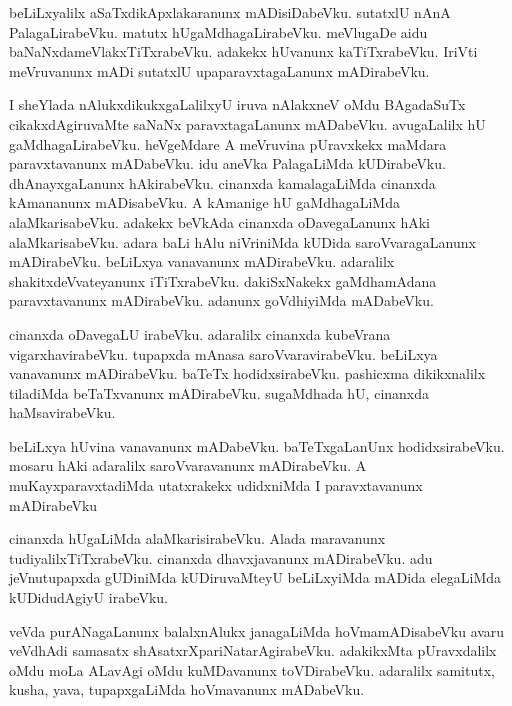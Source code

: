\documentclass{article}
\begin{document}
\begin{mn}
beLiLxyalilx  aSaTxdikApxlakaranunx  mADisiDabeVku.  sutatxlU  nAnA  PalagaLirabeVku.  
matutx  hUgaMdhagaLirabeVku.  meVlugaDe  aidu  baNaNxdameVlakxTiTxrabeVku.  adakekx  
hUvanunx  kaTiTxrabeVku.  IriVti  meVruvanunx  mADi  sutatxlU  upaparavxtagaLanunx  mADirabeVku.
\end{mn}

\begin{mn}
I  sheYlada  nAlukxdikukxgaLalilxyU  iruva  nAlakxneV  oMdu  BAgadaSuTx  cikakxdAgiruvaMte  
saNaNx  paravxtagaLanunx  mADabeVku.  avugaLalilx  hU  gaMdhagaLirabeVku.  heVgeMdare  A  
meVruvina  pUravxkekx  maMdara  paravxtavanunx   mADabeVku.  idu  aneVka  PalagaLiMda  
kUDirabeVku.  dhAnayxgaLanunx  hAkirabeVku.  cinanxda  kamalagaLiMda  cinanxda  kAmananunx  
mADisabeVku.  A  kAmanige  hU  gaMdhagaLiMda  alaMkarisabeVku. adakekx  beVkAda  cinanxda  
oDavegaLanunx  hAki  alaMkarisabeVku.  adara  baLi  hAlu  niVriniMda  kUDida  saroVvaragaLanunx 
mADirabeVku.  beLiLxya  vanavanunx  mADirabeVku.  adaralilx  shakitxdeVvateyanunx  iTiTxrabeVku.  
dakiSxNakekx  gaMdhamAdana  paravxtavanunx  mADirabeVku.  adanunx  goVdhiyiMda  mADabeVku.  
\end{mn}

\begin{mn}
cinanxda  oDavegaLU  irabeVku.  adaralilx  cinanxda  kubeVrana  vigarxhavirabeVku.  tupapxda  
mAnasa  saroVvaravirabeVku.  beLiLxya  vanavanunx  mADirabeVku.  baTeTx hodidxsirabeVku.  
pashicxma dikikxnalilx  tiladiMda  beTaTxvanunx  mADirabeVku.  sugaMdhada  hU,  cinanxda  haMsavirabeVku.
\end{mn}

\begin{mn}
beLiLxya  hUvina  vanavanunx  mADabeVku.  baTeTxgaLanUnx  hodidxsirabeVku.  mosaru  
hAki  adaralilx  saroVvaravanunx  mADirabeVku.  A  muKayxparavxtadiMda  utatxrakekx  
udidxniMda  I  paravxtavanunx  mADirabeVku
\end{mn}

\begin{mn}
cinanxda  hUgaLiMda  alaMkarisirabeVku.  Alada  maravanunx  tudiyalilxTiTxrabeVku.  
cinanxda  dhavxjavanunx  mADirabeVku.  adu  jeVnutupapxda  gUDiniMda  kUDiruvaMteyU  
beLiLxyiMda  mADida  elegaLiMda  kUDidudAgiyU  irabeVku.
\end{mn}

\begin{mn}
veVda purANagaLanunx  balalxnAlukx  janagaLiMda  hoVmamADisabeVku  avaru  veVdhAdi  samasatx  
shAsatxrXpariNatarAgirabeVku.  adakikxMta  pUravxdalilx  oMdu  moLa  ALavAgi  oMdu  kuMDavanunx  
toVDirabeVku.  adaralilx  samitutx,  kusha,  yava,  tupapxgaLiMda  hoVmavanunx  mADabeVku.
\end{mn}
\end{document}
